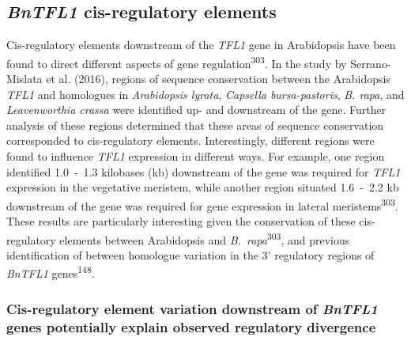\documentclass[12pt,]{book}
\begin{document}
\subsection{\texorpdfstring{\emph{BnTFL1} cis-regulatory
elements}{BnTFL1 cis-regulatory elements}}\label{section:spring:tfl1regulation}

Cis-regulatory elements downstream of the \emph{TFL1} gene in
Arabidopsis have been found to direct different aspects of gene
regulation\textsuperscript{303}. In the study by Serrano-Mislata et al.
(2016), regions of sequence conservation between the Arabidopsis
\emph{TFL1} and homologues in \emph{Arabidopsis lyrata}, \emph{Capsella
bursa-pastoris}, \emph{B. rapa}, and \emph{Leavenworthia crassa} were
identified up- and downstream of the gene. Further analysis of these
regions determined that these areas of sequence conservation
corresponded to cis-regulatory elements. Interestingly, different
regions were found to influence \emph{TFL1} expression in different
ways. For example, one region identified 1.0~-~1.3 kilobases (kb)
downstream of the gene was required for \emph{TFL1} expression in the
vegetative meristem, while another region situated 1.6~-~2.2 kb
downstream of the gene was required for gene expression in lateral
meristems\textsuperscript{303}. These results are particularly
interesting given the conservation of these cis-regulatory elements
between Arabidopsis and \emph{B.~rapa}\textsuperscript{303}, and
previous identification of between homologue variation in the 3'
regulatory regions of \emph{BnTFL1} genes\textsuperscript{148}.

\subsubsection{\texorpdfstring{Cis-regulatory element variation
downstream of \emph{BnTFL1} genes potentially explain observed
regulatory
divergence}{Cis-regulatory element variation downstream of BnTFL1 genes potentially explain observed regulatory divergence}}\label{section:spring:tfl1conservation}
\end{document}

